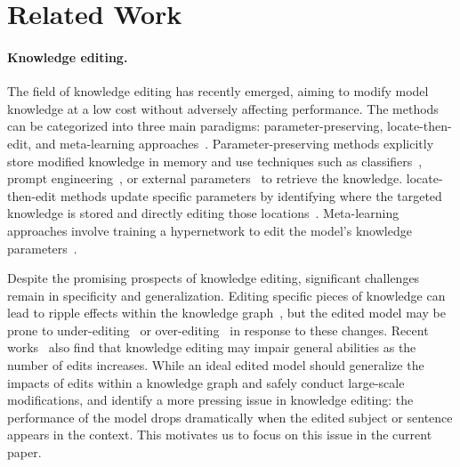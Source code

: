 \section{Related Work}
\paragraph{Knowledge editing.} The field of knowledge editing has recently emerged, aiming to modify model knowledge at a low cost without adversely affecting performance.
The methods can be categorized into three main paradigms: parameter-preserving, locate-then-edit, and meta-learning approaches~\citep{yao2023editing,wang2023knowledge,mazzia2023survey}.
Parameter-preserving methods explicitly store modified knowledge in memory and use techniques such as classifiers~\citep{SERAC}, prompt engineering~\citep{madaan2022memory, zhong2023mquake, IKE}, or external parameters~\citep{dong2022calibrating, huang2023transformer, hartvigsen2024aging, wang2024wise} to retrieve the knowledge.
locate-then-edit methods update specific parameters by identifying where the targeted knowledge is stored and directly editing those locations~\citep{rome, memit, pmet, bird}. Meta-learning approaches involve training a hypernetwork to edit the model’s knowledge parameters~\citep{mend, malmen}.


Despite the promising prospects of knowledge editing, significant challenges remain in specificity and generalization.
Editing specific pieces of knowledge can lead to ripple effects within the knowledge graph~\citep{ripple_fact, ripple_general}, but the edited model may be prone to under-editing~\citep{eval_depend, pinter2023emptying} or over-editing~\citep{li2023pitfalls} in response to these changes.
Recent works~\citep{general_hurt, hazra2024sowing, yang2024butterfly} also find that knowledge editing may impair general abilities as the number of edits increases.
While an ideal edited model should generalize the impacts of edits within a knowledge graph and safely conduct large-scale modifications, \citet{hoelscher2023detecting} and \citet{rosati2024long} identify a more pressing issue in knowledge editing: the performance of the model drops dramatically when the edited subject or sentence appears in the context.
This motivates us to focus on this issue in the current paper.

